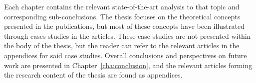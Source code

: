 Each chapter contains the relevant state-of-the-art analysis to that topic and corresponding sub-conclusions. The thesis focuses on the theoretical concepts presented in the publications, but most of these concepts have been illustrated through cases studies in the articles. These case studies are not presented within the body of the thesis, but the reader can refer to the relevant articles in the appendices for said case studies. Overall conclusions and perspectives on future work are presented in Chapter~\ref{cha:conclusion}, and the relevant articles forming the research content of the thesis are found as appendices. 




